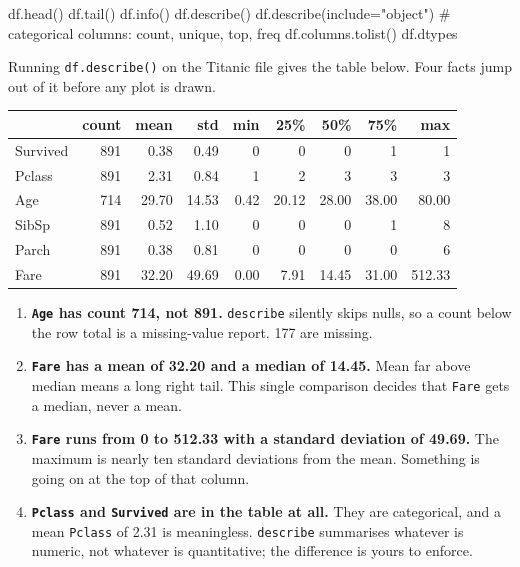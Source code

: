 \documentclass[11pt,a4paper]{article}
\begin{document}
\begin{py}
df.head()
df.tail()
df.info()
df.describe()
df.describe(include="object")     # categorical columns: count, unique, top, freq
df.columns.tolist()
df.dtypes
\end{py}

Running \lstinline|df.describe()| on the Titanic file gives the table below. Four facts
jump out of it before any plot is drawn.

\begin{tabularx}{\textwidth}{@{}l r r r r r r r r@{}}
\toprule
\rowcolor{tablehead} & \textbf{count} & \textbf{mean} & \textbf{std} & \textbf{min} & \textbf{25\%} & \textbf{50\%} & \textbf{75\%} & \textbf{max} \\
\midrule
Survived & 891 & 0.38 & 0.49 & 0 & 0 & 0 & 1 & 1 \\
Pclass & 891 & 2.31 & 0.84 & 1 & 2 & 3 & 3 & 3 \\
Age & 714 & 29.70 & 14.53 & 0.42 & 20.12 & 28.00 & 38.00 & 80.00 \\
SibSp & 891 & 0.52 & 1.10 & 0 & 0 & 0 & 1 & 8 \\
Parch & 891 & 0.38 & 0.81 & 0 & 0 & 0 & 0 & 6 \\
Fare & 891 & 32.20 & 49.69 & 0.00 & 7.91 & 14.45 & 31.00 & 512.33 \\
\bottomrule
\end{tabularx}

\begin{enumerate}\itemsep4pt
  \item \textbf{\texttt{Age} has count 714, not 891.} \lstinline|describe| silently skips
        nulls, so a count below the row total is a missing-value report. 177 are missing.
  \item \textbf{\texttt{Fare} has a mean of 32.20 and a median of 14.45.} Mean far above
        median means a long right tail. This single comparison decides that \texttt{Fare}
        gets a median, never a mean.
  \item \textbf{\texttt{Fare} runs from 0 to 512.33 with a standard deviation of 49.69.}
        The maximum is nearly ten standard deviations from the mean. Something is going on
        at the top of that column.
  \item \textbf{\texttt{Pclass} and \texttt{Survived} are in the table at all.} They are
        categorical, and a mean \texttt{Pclass} of 2.31 is meaningless. \lstinline|describe|
        summarises whatever is numeric, not whatever is quantitative; the difference is
        yours to enforce.
\end{enumerate}
\end{document}
